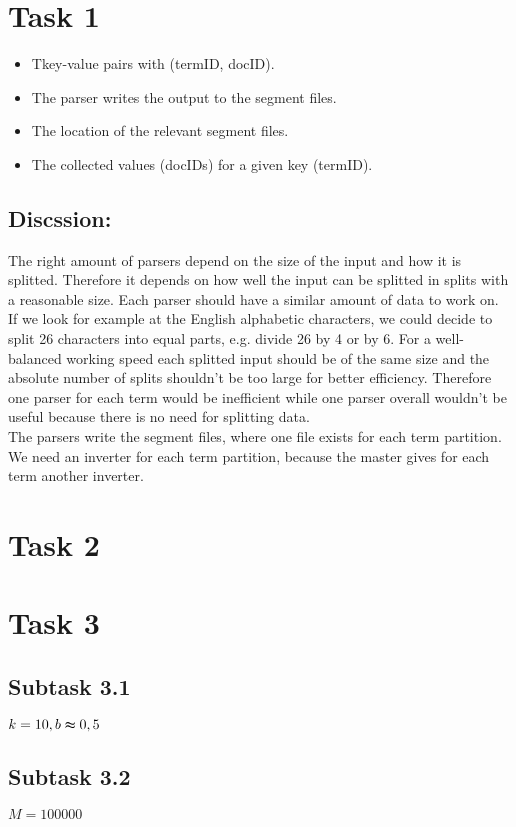 \documentclass[a4paper]{scrartcl}
\begin{document}
\section*{Task 1}
\begin{itemize}
	\item Tkey-value pairs with (termID, docID).
	\item The parser writes the output to the segment files.
	\item The location of the relevant segment files.
	\item The collected values (docIDs) for a given key (termID).
\end{itemize}
\subsection*{Discssion:}
The right amount of parsers depend on the size of the input and how it is splitted. 
Therefore it depends on how well the input can be splitted in splits with a reasonable size. Each parser should have a similar amount of data to work on.
If we look for example at the English alphabetic characters, we could decide to split 26 characters into equal parts, e.g. divide 26 by 4 or by 6.
For a well-balanced working speed each splitted input should be of the same size and the absolute number of splits shouldn't be too large for better
efficiency. Therefore one parser for each term would be inefficient while one parser overall wouldn't be useful because there is no need for splitting data.\\

The parsers write the segment files, where one file exists for each term partition. We need an inverter for each term partition, because the master
gives for each term another inverter.

\section*{Task 2}

\section*{Task 3}
\subsection*{Subtask 3.1}
$k=10, b\thickapprox 0,5$
\subsection*{Subtask 3.2}
$M=100000$
\end{document}
